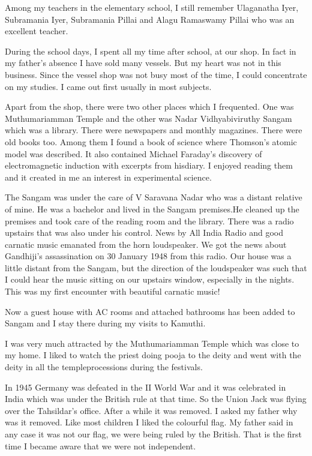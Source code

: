 Among my teachers in the elementary school, I still remember Ulaganatha
Iyer, Subramania Iyer, Subramania Pillai and Alagu Ramaswamy Pillai who
was an excellent teacher.

During the school days, I spent all my time after school, at our shop. 
In fact in my father's absence I have sold many vessels. But my heart was 
not in this business. Since the vessel shop was not busy most of the 
time, I could concentrate on my studies. I came out first usually in 
most subjects.

Apart from the shop, there were two other places which I frequen\-ted. One 
was Muthumariamman Temple and the other was Nadar Vidhyabiviruthy Sangam 
which was a library. There were newspapers and monthly magazines. There 
were old books too. Among them I found a book of science where Thomson's 
atomic model was described. It also contained Michael Faraday's\break 
discovery of electromagnetic induction with excerpts from his\break diary. I 
enjoyed reading them and it created in me an interest in experimental science.

The Sangam was under the care of V Saravana Nadar who was a distant 
relative of mine. He was a bachelor and lived in the Sangam premises.He 
cleaned up the premises and took care of the reading room and the 
library. There was a radio upstairs that was also under his control. 
News by All India Radio and good carnatic music emanated from the horn 
loudspeaker. We got the news about Gandhiji's assassination on 30 
January 1948 from this radio. Our house was a little distant from the 
Sangam, but the direction of the loudspeaker was such that I could hear 
the music sitting on our upstairs window, especially in the nights. 
This was my first encounter with beautiful carnatic music!

Now a guest house with AC rooms and attached bathrooms has been added to 
Sangam and I stay there during my visits to Kamuthi.


I was very much attracted by the Muthumariamman Temple which was close 
to my home. I liked to watch the priest doing pooja to the deity and 
went with the deity in all the temple\break processions during the festivals.
  
In 1945 Germany was defeated in the II World War and it was celebrated 
in India which was under the British rule at that time. So the Union 
Jack was flying over the Tahsildar's office. After a while it was 
removed. I asked my father why was it removed. Like most children I 
liked the colourful flag. My father said in any case it was not our 
flag, we were being ruled by the British. That is the first time I 
became aware that we were not independent.


